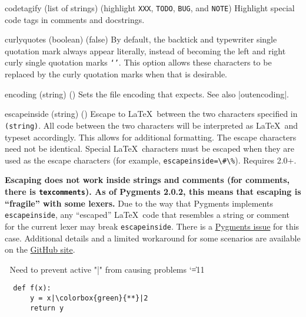 \begin{optionlist}
  \item[codetagify (list of strings) (\textrm{highlight \texttt{XXX}, \texttt{TODO}, \texttt{BUG}, and \texttt{NOTE}})]
    Highlight special code tags in comments and docstrings.

\item[curlyquotes (boolean) (false)]
By default, the backtick \texttt{\textasciigrave} and typewriter single quotation mark \texttt{\textquotesingle} always appear literally, instead of becoming the left and right curly single quotation marks \texttt{`'}.  This option allows these characters to be replaced by the curly quotation marks when that is desirable.

  \item[encoding (string) (\meta{system-specific})]
    Sets the file encoding that  expects.  See also |outencoding|.
  \item[escapeinside (string) (\meta{none})]
  Escape to \LaTeX\ between the two characters specified in \texttt{\string(string\string)}.  All code between the two characters will be interpreted as \LaTeX\ and typeset accordingly.  This allows for additional formatting.  The escape characters need not be identical.  Special \LaTeX\ characters must be escaped when they are used as the escape characters (for example, \texttt{escapeinside=\textbackslash\#\textbackslash\%}).  Requires  2.0+.

\textbf{Escaping does not work inside strings and comments (for comments, there is \texttt{texcomments}).  As of Pygments 2.0.2, this means that escaping is ``fragile'' with some lexers.}  Due to the way that Pygments implements \texttt{escapeinside}, any ``escaped'' \LaTeX\ code that resembles a string or comment for the current lexer may break \texttt{escapeinside}.  There is a \href{https://bitbucket.org/birkenfeld/pygments-main/issue/1118}{Pygments issue} for this case.  Additional details and a limited workaround for some scenarios are available on the \href{https://github.com/gpoore/minted/issues/70#issuecomment-111729930}{ GitHub site}.

\begingroup  ^^A Need to prevent active "|" from causing problems
\catcode`\|=11
\begin{example}
  \begin{verbatim}
  def f(x):
      y = x|\colorbox{green}{**}|2
      return y
  \end{verbatim}
\end{example}
\endgroup


\end{optionlist}
